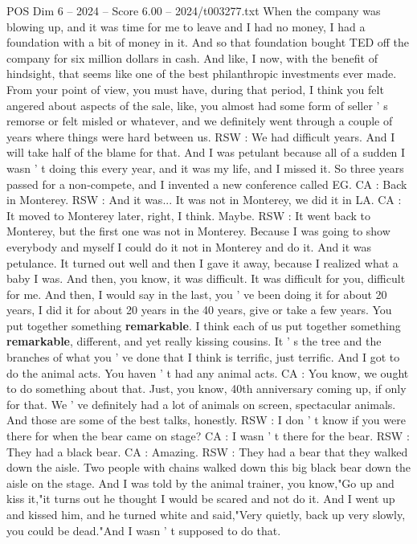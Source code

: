 \begin{textsample}{POS Dim 6 – 2024 – Score 6.00 – 2024/t003277.txt}
When the company was blowing up, and it was time for me to leave and I had no money, I had a foundation with a bit of money in it.
And so that foundation bought TED off the company for six million dollars in cash.
And like, I now, with the benefit of hindsight, that seems like one of the best philanthropic investments ever made.
From your point of view, you must have, during that period, I think you felt angered about aspects of the sale, like, you almost had some form of seller ' s remorse or felt misled or whatever, and we definitely went through a couple of years where things were hard between us.
RSW : We had difficult years.
And I will take half of the blame for that.
And I was petulant because all of a sudden I wasn ' t doing this every year, and it was my life, and I missed it.
So three years passed for a non-compete, and I invented a new conference called EG.
CA : Back in Monterey.
RSW : And it was...
It was not in Monterey, we did it in LA.
CA : It moved to Monterey later, right, I think.
Maybe.
RSW : It went back to Monterey, but the first one was not in Monterey.
Because I was going to show everybody and myself I could do it not in Monterey and do it.
And it was petulance.
It turned out well and then I gave it away, because I realized what a baby I was.
And then, you know, it was difficult.
It was difficult for you, difficult for me.
And then, I would say in the last, you ' ve been doing it for about 20 years, I did it for about 20 years in the 40 years, give or take a few years.
You put together something \textbf{remarkable}.
I think each of us put together something \textbf{remarkable}, different, and yet really kissing cousins.
It ' s the tree and the branches of what you ' ve done that I think is terrific, just terrific.
And I got to do the animal acts.
You haven ' t had any animal acts.
CA : You know, we ought to do something about that.
Just, you know, 40th anniversary coming up, if only for that.
We ' ve definitely had a lot of animals on screen, spectacular animals.
And those are some of the best talks, honestly.
RSW : I don ' t know if you were there for when the bear came on stage?
CA : I wasn ' t there for the bear.
RSW : They had a black bear.
CA : Amazing.
RSW : They had a bear that they walked down the aisle.
Two people with chains walked down this big black bear down the aisle on the stage.
And I was told by the animal trainer, you know,"Go up and kiss it,"it turns out he thought I would be scared and not do it.
And I went up and kissed him, and he turned white and said,"Very quietly, back up very slowly, you could be dead."And I wasn ' t supposed to do that.

\end{textsample}
